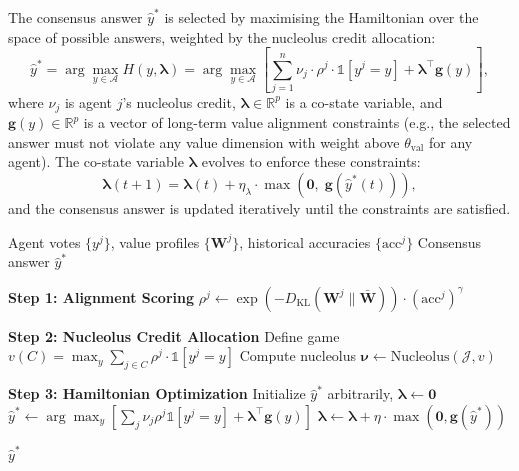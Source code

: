 \documentclass[12pt,a4paper]{article}
\newcommand{\R}{\mathbb{R}}
\newcommand{\calA}{\mathcal{A}}
\newcommand{\calJ}{\mathcal{J}}
\newcommand{\bW}{\bm{W}}
\newcommand{\blambda}{\bm{\lambda}}
\newcommand{\dkl}{D_{\mathrm{KL}}}
\begin{document}
The consensus answer $\hat{y}^*$ is selected by maximising the Hamiltonian over the
space of possible answers, weighted by the nucleolus credit allocation:
\begin{equation}
  \hat{y}^* = \arg\max_{y \in \calA} H(y, \blambda) = \arg\max_{y \in \calA}
  \left[\sum_{j=1}^n \nu_j \cdot \rho^j \cdot \mathbb{1}[y^j = y] + \blambda^\top
  \bm{g}(y)\right],
  \label{eq:hamiltonian_consensus}
\end{equation}
where $\nu_j$ is agent $j$'s nucleolus credit, $\blambda \in \R^p$ is a co-state
variable, and $\bm{g}(y) \in \R^p$ is a vector of long-term value alignment
constraints (e.g., the selected answer must not violate any value dimension with weight
above $\theta_{\mathrm{val}}$ for any agent). The co-state variable $\blambda$ evolves
to enforce these constraints:
\begin{equation}
  \blambda(t+1) = \blambda(t) + \eta_\lambda \cdot \max(\bm{0},\; \bm{g}(\hat{y}^*(t))),
  \label{eq:costate_update}
\end{equation}
and the consensus answer is updated iteratively until the constraints are satisfied.

\begin{algorithm}[H]
\caption{Nucleolus-Weighted Hamiltonian Consensus}
\label{alg:consensus}
\begin{algorithmic}[1]
\Require Agent votes $\{y^j\}$, value profiles $\{\bW^j\}$, historical accuracies $\{\mathrm{acc}^j\}$
\Ensure Consensus answer $\hat{y}^*$

\State \textbf{Step 1: Alignment Scoring}
\For{each agent $j \in \calJ$}
    \State $\rho^j \gets \exp(-\dkl(\bW^j \| \bar{\bW})) \cdot (\mathrm{acc}^j)^\gamma$ 
\EndFor

\State \textbf{Step 2: Nucleolus Credit Allocation}
\State Define game $v(C) = \max_{y} \sum_{j \in C} \rho^j \cdot \mathbb{1}[y^j = y]$
\State Compute nucleolus $\bm{\nu} \gets \text{Nucleolus}(\calJ, v)$

\State \textbf{Step 3: Hamiltonian Optimization}
\State Initialize $\hat{y}^*$ arbitrarily, $\blambda \gets \bm{0}$
\Repeat
    \State $\hat{y}^* \gets \arg\max_{y} \left[ \sum_{j} \nu_j \rho^j \mathbb{1}[y^j = y] + \blambda^\top \bm{g}(y) \right]$
    \State $\blambda \gets \blambda + \eta \cdot \max(\bm{0}, \bm{g}(\hat{y}^*))$

\State \Return $\hat{y}^*$
\end{algorithmic}
\end{algorithm}
\end{document}
